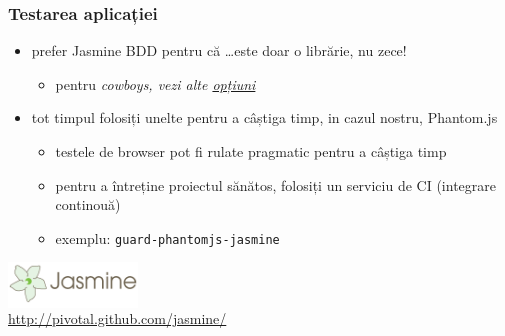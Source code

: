 \documentclass[compress]{beamer}
\begin{document}
\begin{frame}

\frametitle{Testarea aplicației}

\begin{itemize}[<+->]
  \item prefer Jasmine BDD pentru că \ldots este doar o librărie, nu zece!
  \begin{itemize}[<+->]
    \item pentru \em{cowboys}, vezi alte \href{https://github.com/rwldrn/idiomatic.js/\#test-facility}{opțiuni}
  \end{itemize}
  \item tot timpul folosiți unelte pentru a câștiga timp, in cazul nostru, Phantom.js
  \begin{itemize}[<+->]
    \item testele de browser pot fi rulate pragmatic pentru a câștiga timp
    \item pentru a întreține proiectul sănătos, folosiți un serviciu de CI (integrare continouă)
    \item exemplu: \texttt{guard-phantomjs-jasmine}
  \end{itemize}
\end{itemize}

\begin{flushright}
  \colorbox{white}{\includegraphics[height=1.1cm]{jasmine.png}}
  \\
  \tiny \url{http://pivotal.github.com/jasmine/}
\end{flushright}


\end{frame}
\end{document}
